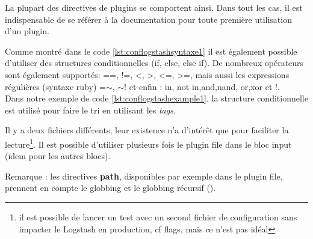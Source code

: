 La plupart des directives de plugins se comportent ainsi. Dans tout les cas, il
est indispensable de se référer à la documentation pour toute première utilisation d'un
plugin.


Comme montré dans le code \ref{lst:conflogstashsyntaxe1} il est également possible 
d'utiliser des structures conditionnelles (if, else, else if).
De nombreux opérateurs sont également supportés: ==, !=, <, >, <=, >=, mais aussi
les expressions régulières (syntaxe ruby) =$\sim$, $\sim$! et enfin : in, not in,and,nand,
or,xor et !.\\[4mm]
Dans notre exemple de code \ref{lst:conflogstashexample1}, la structure conditionnelle
est utilisé pour faire le tri en utilisant les \emph{tags}.


Il y a deux fichiers différents, leur existence n'a d'intérêt que pour faciliter la
lecture\footnote{il est possible de lancer un test avec un second fichier de configuration
sans impacter le Logstash en production, cf flags, mais ce n'est pas idéal}. Il est
possible d'utiliser plusieurs fois le plugin file dans le bloc input (idem pour les 
autres blocs).

Remarque : les directives \textbf{path}, disponibles par exemple dans
le plugin file, prennent en compte le globbing et le globbing récursif 
().


